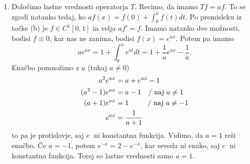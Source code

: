 \documentclass[a4paper, 12pt]{article}
\begin{document}
\begin{enumerate}[label=(\alph*)]
	\item Določimo lastne vrednosti operatorja $T$. Recimo, da imamo $Tf = af$. To se zgodi natanko tedaj, ko $af(x) = f(0) + \int_{0}^x f(t)dt$. Po premisleku iz točke (b) je $f \in C^1[0,1]$ in velja $af' = f$. Imamo natanko dve možnosti, bodisi $f \equiv 0$, kar nas ne zanima, bodisi $f(x) = e^{ax}$. Potem pa imamo
	\[
	ae^{ax} = 1 + \int_{0}^x e^{at}dt = 1 + \frac{1}{a}e^{ax} - \frac{1}{a}.
	\]
	Enačbo pomnožimo z $a$ (tukaj $a \neq 0$)
	\begin{align*}
	a^2e^{ax} &= a + e^{ax} - 1\\
	(a^2 - 1)e^{ax} &= a - 1 \text{\quad/ naj $a \neq 1$}\\
	(a + 1)e^{ax} &= 1 \text{\ \ \quad\quad/ naj $a \neq -1$}\\
	e^{ax} &= \frac{1}{a + 1}
	\end{align*}
	to pa je protislovje, saj $e^.$ ni konstantna funkcija.
	Vidimo, da $a = 1$ reši enačbo. Če $a = -1$, potem $e^{-x} = 2 - e^{-x}$, kar seveda ni enako, saj $e^.$ ni konstantna funkcija. Torej so lastne vrednosti samo $a = 1$.
\end{enumerate}
\end{document}
